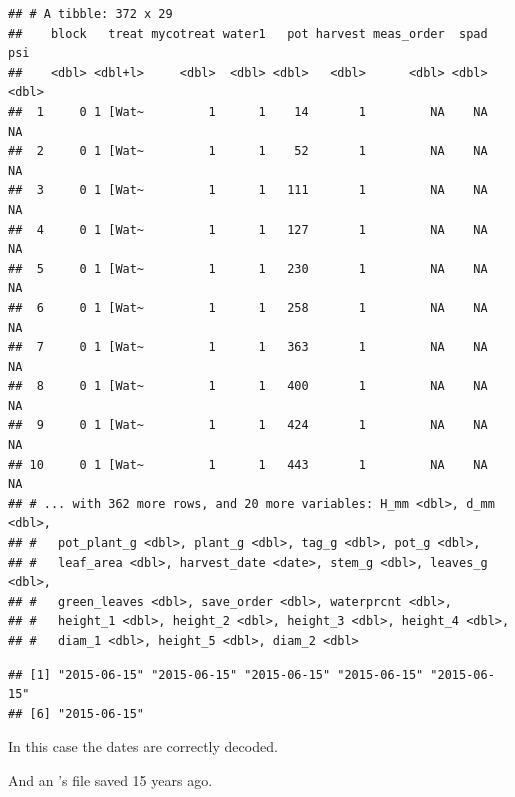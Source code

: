 \documentclass[krantz2]{krantz}\usepackage{knitr}%
\begin{document}
\begin{knitrout}\footnotesize
{}\color{fgcolor}\begin{kframe}
\begin{alltt}
 \hlkwb{<-} \hlstd{(} \hlstd{=} \hlstd{)}
\end{alltt}
\begin{verbatim}
## # A tibble: 372 x 29
##    block   treat mycotreat water1   pot harvest meas_order  spad   psi
##    <dbl> <dbl+l>     <dbl>  <dbl> <dbl>   <dbl>      <dbl> <dbl> <dbl>
##  1     0 1 [Wat~         1      1    14       1         NA    NA    NA
##  2     0 1 [Wat~         1      1    52       1         NA    NA    NA
##  3     0 1 [Wat~         1      1   111       1         NA    NA    NA
##  4     0 1 [Wat~         1      1   127       1         NA    NA    NA
##  5     0 1 [Wat~         1      1   230       1         NA    NA    NA
##  6     0 1 [Wat~         1      1   258       1         NA    NA    NA
##  7     0 1 [Wat~         1      1   363       1         NA    NA    NA
##  8     0 1 [Wat~         1      1   400       1         NA    NA    NA
##  9     0 1 [Wat~         1      1   424       1         NA    NA    NA
## 10     0 1 [Wat~         1      1   443       1         NA    NA    NA
## # ... with 362 more rows, and 20 more variables: H_mm <dbl>, d_mm <dbl>,
## #   pot_plant_g <dbl>, plant_g <dbl>, tag_g <dbl>, pot_g <dbl>,
## #   leaf_area <dbl>, harvest_date <date>, stem_g <dbl>, leaves_g <dbl>,
## #   green_leaves <dbl>, save_order <dbl>, waterprcnt <dbl>,
## #   height_1 <dbl>, height_2 <dbl>, height_3 <dbl>, height_4 <dbl>,
## #   diam_1 <dbl>, height_5 <dbl>, diam_2 <dbl>
\end{verbatim}
\begin{alltt}
\hlopt{$}
\end{alltt}
\begin{verbatim}
## [1] "2015-06-15" "2015-06-15" "2015-06-15" "2015-06-15" "2015-06-15"
## [6] "2015-06-15"
\end{verbatim}
\end{kframe}
\end{knitrout}

In this case the dates are correctly decoded.

And an 's  file saved 15 years ago.
\end{document}
